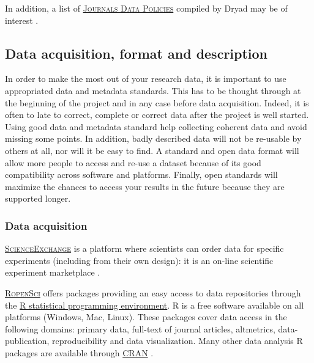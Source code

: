 \noindent In addition, a list of \textsc{\href{http://datadryad.org/pages/jdap}{Journals Data Policies}} compiled by Dryad may be of interest \cite{dryad_joint_2014}.

\subsection{Data acquisition, format and description}

In order to make the most out of your research data, it is important to use appropriated data and metadata standards. This has to be thought through at the beginning of the project and in any case before data acquisition. Indeed, it is often to late to correct, complete or correct data after the project is well started. Using good data and metadata standard help collecting coherent data and avoid missing some points. In addition, badly described data will not be re-usable by others at all, nor will it be easy to find. A standard and open data format will allow more people to access and re-use a dataset because of its good compatibility across software and platforms. Finally, open standards will maximize the chances to access your results in the future because they are supported longer.


\subsubsection{Data acquisition}

\noindent {} \textsc{\href{http://scienceexchange.com}{ScienceExchange}} is a platform where scientists can order data for specific experiments (including from their own design): it is an on-line scientific experiment marketplace \cite{scienceexchange_science_2015}.

\vspace{0.4cm}

\noindent {} \textsc{\href{http://ropensci.org}{RopenSci}} offers packages providing an easy access to data repositories through the \href{http://r-project.org}{R statistical programming environment}. R is a free software available on all platforms (Windows, Mac, Linux). These packages cover data access in the following domains: primary data, full-text of journal articles, altmetrics, data-publication, reproducibility and data visualization. Many other data analysis R packages are available through \href{http://cran.r-project.org/}{CRAN} \cite{ropensci.org_ropensci_2015,r_project_r:_2015}.

